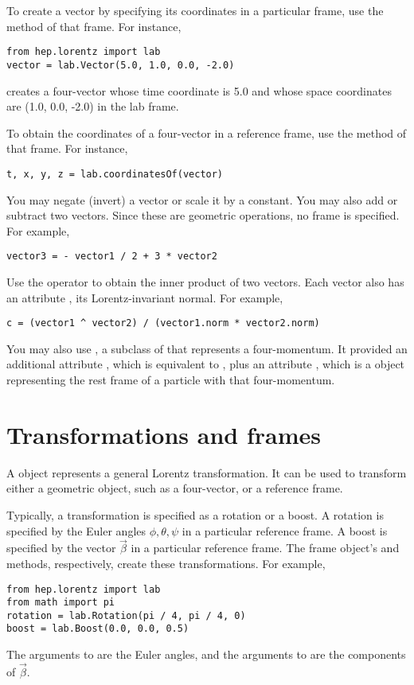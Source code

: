 To create a vector by specifying its coordinates in a particular frame,
use the  method of that frame.  For instance,
\begin{verbatim}
from hep.lorentz import lab
vector = lab.Vector(5.0, 1.0, 0.0, -2.0)
\end{verbatim}
creates a four-vector whose time coordinate is 5.0 and whose space
coordinates are (1.0, 0.0, -2.0) in the lab frame.

To obtain the coordinates of a four-vector in a reference frame, use the
 method of that frame.  For instance,
\begin{verbatim}
t, x, y, z = lab.coordinatesOf(vector)
\end{verbatim}

You may negate (invert) a vector or scale it by a constant.  You may
also add or subtract two vectors.  Since these are geometric operations,
no frame is specified.  For example,
\begin{verbatim}
vector3 = - vector1 / 2 + 3 * vector2
\end{verbatim}
Use the \code{\^} operator to obtain the inner product of two vectors.
Each vector also has an attribute , its Lorentz-invariant
normal.  For example,
\begin{verbatim}
c = (vector1 ^ vector2) / (vector1.norm * vector2.norm)
\end{verbatim}

You may also use , a subclass of
 that represents a four-momentum.  It provided an
additional attribute , which is equivalent to
, plus an attribute , which is a
 object representing the rest frame of a particle with that
four-momentum. 

\section{Transformations and frames}

A  object represents a general Lorentz
transformation.  It can be used to transform either a geometric object,
such as a four-vector, or a reference frame.

Typically, a transformation is specified as a rotation or a boost.  A
rotation is specified by the Euler angles $\phi, \theta, \psi$ in a
particular reference frame.  A boost is specified by the vector
$\vec\beta$ in a particular reference frame.  The frame object's
 and  methods, respectively, create these
transformations.   For example, 
\begin{verbatim}
from hep.lorentz import lab
from math import pi
rotation = lab.Rotation(pi / 4, pi / 4, 0)
boost = lab.Boost(0.0, 0.0, 0.5)
\end{verbatim}
The arguments to  are the Euler angles, and the
arguments to  are the components of $\vec\beta$.

